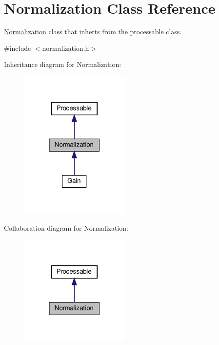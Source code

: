 \hypertarget{classNormalization}{}\section{Normalization Class Reference}
\label{classNormalization}


\hyperlink{classNormalization}{Normalization} class that inherts from the processable class.  




{\ttfamily \#include $<$normalization.\+h$>$}



Inheritance diagram for Normalization\+:
\nopagebreak
\begin{figure}[H]
\begin{center}
\leavevmode
\includegraphics[width=157pt]{d2/d5e/classNormalization__inherit__graph}
\end{center}
\end{figure}


Collaboration diagram for Normalization\+:
\nopagebreak
\begin{figure}[H]
\begin{center}
\leavevmode
\includegraphics[width=157pt]{de/d74/classNormalization__coll__graph}
\end{center}
\end{figure}
